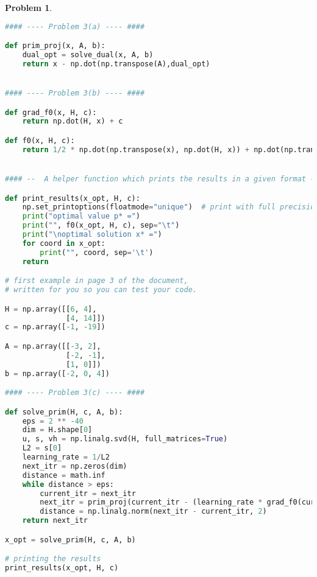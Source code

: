 \documentclass[11pt]{article}
\newtheorem{problem}{Problem}
\begin{document}
\begin{problem}
{\begin{lstlisting}[language = Python]
#### ---- Problem 3(a) ---- ####

def prim_proj(x, A, b):
    dual_opt = solve_dual(x, A, b)
    return x - np.dot(np.transpose(A),dual_opt)


#### ---- Problem 3(b) ---- ####

def grad_f0(x, H, c):
    return np.dot(H, x) + c

def f0(x, H, c):
    return 1/2 * np.dot(np.transpose(x), np.dot(H, x)) + np.dot(np.transpose(c), x)


#### --  A helper function which prints the results in a given format -- ####

def print_results(x_opt, H, c):
    np.set_printoptions(floatmode="unique")  # print with full precision
    print("optimal value p* =")
    print("", f0(x_opt, H, c), sep="\t")
    print("\noptimal solution x* =")
    for coord in x_opt:
        print("", coord, sep='\t')
    return

# first example in page 3 of the document,
# written for you so you can test your code.

H = np.array([[6, 4],
              [4, 14]])
c = np.array([-1, -19])

A = np.array([[-3, 2],
              [-2, -1],
              [1, 0]])
b = np.array([-2, 0, 4])

#### ---- Problem 3(c) ---- ####

def solve_prim(H, c, A, b):
    eps = 2 ** -40
    dim = H.shape[0]
    u, s, vh = np.linalg.svd(H, full_matrices=True)
    L2 = s[0]
    learning_rate = 1/L2
    next_itr = np.zeros(dim)
    distance = math.inf
    while distance > eps:
        current_itr = next_itr
        next_itr = prim_proj(current_itr - (learning_rate * grad_f0(current_itr, H, c)), A, b)
        distance = np.linalg.norm(next_itr - current_itr, 2)
    return next_itr

x_opt = solve_prim(H, c, A, b)

# printing the results
print_results(x_opt, H, c)
\end{lstlisting}
}
\end{problem}


\newpage

\appendix




\end{document}
